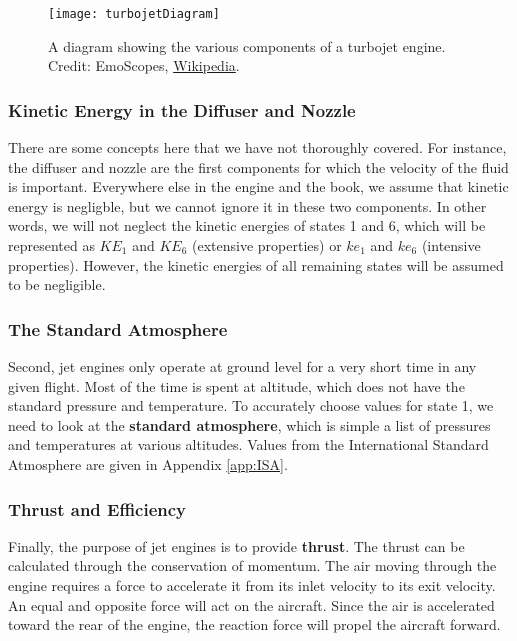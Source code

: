\begin{figure}[H]
  \centering
  \texttt{[image: turbojetDiagram]}
  \caption{A diagram showing the various components of a turbojet engine. Credit: EmoScopes, \href{https://commons.wikimedia.org/wiki/File:Turbojet_operation-axial_flow-en.svg}{Wikipedia}.}
  \label{fig:turbojet}
\end{figure}

\subsubsection*{Kinetic Energy in the Diffuser and Nozzle}

There are some concepts here that we have not thoroughly covered.  For instance, the diffuser and nozzle are the first components for which the velocity of the fluid is important. Everywhere else in the engine and the book, we assume that kinetic energy is negligble, but we cannot ignore it in these two components.  In other words, we will not neglect the kinetic energies of states 1 and 6, which will be represented as $KE_1$ and $KE_6$ (extensive properties) or $ke_1$ and $ke_6$ (intensive properties).  However, the kinetic energies of all remaining states will be assumed to be negligible.

\subsubsection*{The Standard Atmosphere}
Second, jet engines only operate at ground level for a very short time in any given flight.  Most of the time is spent at altitude, which does not have the standard pressure and temperature.  To accurately choose values for state 1, we need to look at the {\bf standard atmosphere}, which is simple a list of pressures and temperatures at various altitudes.  Values from the International Standard Atmosphere are given in Appendix \ref{app:ISA}.

\subsubsection*{Thrust and Efficiency}
Finally, the purpose of jet engines is to provide {\bf thrust}.  The thrust can be calculated through the conservation of momentum.  The air moving through the engine requires a force to accelerate it from its inlet velocity to its exit velocity.  An equal and opposite force will act on the aircraft.  Since the air is accelerated toward the rear of the engine, the reaction force will propel the aircraft forward.

